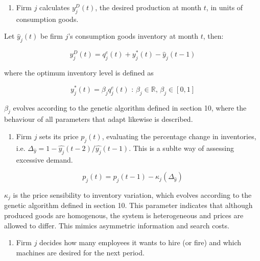 \documentclass[11pt,]{article}
\providecommand{\tightlist}{%
\setlength{\itemsep}{0pt}\setlength{\parskip}{0pt}}
\begin{document}
\begin{enumerate}
\def\labelenumi{\alph{enumi}.}
\setcounter{enumi}{1}
\tightlist
\item
  Firm \(j\) calculates \(y_j^D(t)\), the desired production at month
  \(t\), in units of consumption goods.
\end{enumerate}

Let \(\hat{y}_j(t)\) be firm \(j\)'s consumption goods inventory at
month \(t\), then:

\begin{equation}
y_j^D(t) = q_j^e(t) + y_j^{*}(t) - \hat{y}_j(t-1)
\end{equation}

where the optimum inventory level is defined as

\begin{equation}
y_j^{*}(t) = \beta_j q_j^e(t) \text{ : } \beta_j \in \mathbb{R} \text{, } \beta_j \in [0,1]
\end{equation}

\(\beta_j\) evolves according to the genetic algorithm defined in
section 10, where the behaviour of all parameters that adapt likewise is
described.

\begin{enumerate}
\def\labelenumi{\alph{enumi}.}
\setcounter{enumi}{2}
\tightlist
\item
  Firm \(j\) sets its price \(p_{j}(t)\), evaluating the percentage
  change in inventories, i.e.
  \(\Delta_{\hat{y}} = 1 - \hat{y_j}(t-2)/\hat{y_j}(t-1)\). This is a
  sublte way of assessing excessive demand.
\end{enumerate}

\begin{equation}
p_j(t) = p_j(t-1) - \kappa_j(\Delta_{\hat{y}})
\end{equation}

\(\kappa_j\) is the price sensibility to inventory variation, which
evolves according to the genetic algorithm defined in section 10. This
parameter indicates that although produced goods are homogenous, the
system is heterogeneous and prices are allowed to differ. This mimics
asymmetric information and search costs.

\begin{enumerate}
\def\labelenumi{\alph{enumi}.}
\setcounter{enumi}{3}
\tightlist
\item
  Firm \(j\) decides how many employees it wants to hire (or fire) and
  which machines are desired for the next period.
\end{enumerate}
\end{document}
